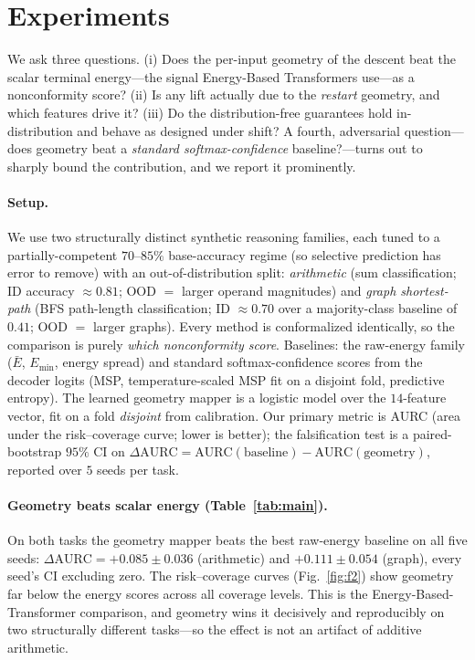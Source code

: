 \section{Experiments}
\label{sec:experiments}

We ask three questions. (i) Does the per-input geometry of the descent beat the scalar terminal
energy---the signal Energy-Based Transformers use---as a nonconformity score? (ii) Is any lift
actually due to the \emph{restart} geometry, and which features drive it? (iii) Do the
distribution-free guarantees hold in-distribution and behave as designed under shift? A fourth,
adversarial question---does geometry beat a \emph{standard softmax-confidence} baseline?---turns
out to sharply bound the contribution, and we report it prominently.

\paragraph{Setup.} We use two structurally distinct synthetic reasoning families, each tuned to a
partially-competent $70$--$85\%$ base-accuracy regime (so selective prediction has error to remove)
with an out-of-distribution split: \emph{arithmetic} (sum classification; ID accuracy $\approx
0.81$; OOD $=$ larger operand magnitudes) and \emph{graph shortest-path} (BFS path-length
classification; ID $\approx 0.70$ over a majority-class baseline of $0.41$; OOD $=$ larger graphs).
Every method is conformalized identically, so the comparison is purely \emph{which nonconformity
score}. Baselines: the raw-energy family ($\bar E$, $E_{\min}$, energy spread) and standard
softmax-confidence scores from the decoder logits (MSP, temperature-scaled MSP fit on a disjoint
fold, predictive entropy). The learned geometry mapper is a logistic model over the $14$-feature
vector, fit on a fold \emph{disjoint} from calibration. Our primary metric is AURC (area under the
risk--coverage curve; lower is better); the falsification test is a paired-bootstrap $95\%$ CI on
$\Delta\mathrm{AURC} = \mathrm{AURC}(\text{baseline}) - \mathrm{AURC}(\text{geometry})$, reported over
$5$ seeds per task.

\paragraph{Geometry beats scalar energy (Table~\ref{tab:main}).} On both tasks the geometry mapper
beats the best raw-energy baseline on all five seeds: $\Delta\mathrm{AURC} = +0.085\pm0.036$
(arithmetic) and $+0.111\pm0.054$ (graph), every seed's CI excluding zero. The risk--coverage curves
(Fig.~\ref{fig:f2}) show geometry far below the energy scores across all coverage levels. This is the
Energy-Based-Transformer comparison, and geometry wins it decisively and reproducibly on two
structurally different tasks---so the effect is not an artifact of additive arithmetic.

